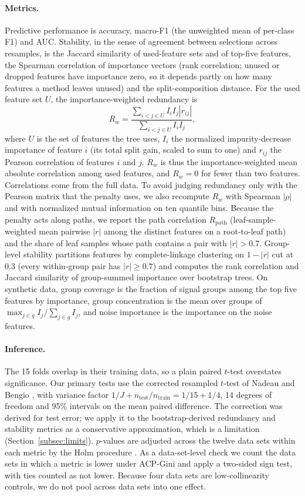 \documentclass[pdflatex,sn-basic,Numbered]{sn-jnl}
\begin{document}
\paragraph{Metrics.} Predictive performance is accuracy, macro-F1 (the unweighted mean of per-class F1) and AUC. Stability, in the sense of agreement between selections across resamples, is the Jaccard similarity of used-feature sets and of top-five features, the Spearman correlation of importance vectors (rank correlation; unused or dropped features have importance zero, so it depends partly on how many features a method leaves unused) and the split-composition distance. For the used feature set $U$, the importance-weighted redundancy is
\begin{equation}
R_w=\frac{\sum_{i<j\in U}I_iI_j|r_{ij}|}{\sum_{i<j\in U}I_iI_j},
\end{equation}
where $U$ is the set of features the tree uses, $I_i$ the normalized impurity-decrease importance of feature $i$ (its total split gain, scaled to sum to one) and $r_{ij}$ the Pearson correlation of features $i$ and $j$. $R_w$ is thus the importance-weighted mean absolute correlation among used features, and $R_w=0$ for fewer than two features. Correlations come from the full data. To avoid judging redundancy only with the Pearson matrix that the penalty uses, we also recompute $R_w$ with Spearman $|\rho|$ and with normalized mutual information on ten quantile bins. Because the penalty acts along paths, we report the path correlation $R_{\mathrm{path}}$ (leaf-sample-weighted mean pairwise $|r|$ among the distinct features on a root-to-leaf path) and the share of leaf samples whose path contains a pair with $|r|>0.7$. Group-level stability partitions features by complete-linkage clustering on $1-|r|$ cut at 0.3 (every within-group pair has $|r|\ge0.7$) and computes the rank correlation and Jaccard similarity of group-summed importance over bootstrap trees. On synthetic data, group coverage is the fraction of signal groups among the top five features by importance, group concentration is the mean over groups of $\max_{j\in g}I_j/\sum_{j\in g}I_j$, and noise importance is the importance on the noise features.

\paragraph{Inference.} The 15 folds overlap in their training data, so a plain paired $t$-test overstates significance. Our primary tests use the corrected resampled $t$-test of Nadeau and Bengio \cite{nadeau2003inference}, with variance factor $1/J+n_{\mathrm{test}}/n_{\mathrm{train}}=1/15+1/4$, 14 degrees of freedom and 95\% intervals on the mean paired difference. The correction was derived for test error; we apply it to the bootstrap-derived redundancy and stability metrics as a conservative approximation, which is a limitation (Section~\ref{subsec:limits}). $p$-values are adjusted across the twelve data sets within each metric by the Holm procedure \cite{holm1979simple}. As a data-set-level check we count the data sets in which a metric is lower under ACP-Gini and apply a two-sided sign test, with ties counted as not lower. Because four data sets are low-collinearity controls, we do not pool across data sets into one effect.
\end{document}

